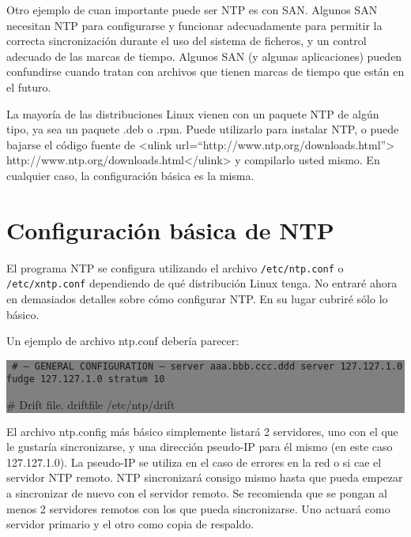 \documentclass[12pt]{article}
\begin{document}
Otro ejemplo de cuan importante puede ser NTP es con SAN. Algunos SAN
necesitan NTP para configurarse y funcionar adecuadamente para permitir
la correcta sincronización durante el uso del sistema de ficheros, y un
control adecuado de las marcas de tiempo. Algunos SAN (y algunas
aplicaciones) pueden confundirse cuando tratan con archivos que tienen marcas
de tiempo que están en el futuro.



La mayoría de las distribuciones Linux vienen con un paquete NTP de
algún tipo, ya sea un paquete .deb o .rpm. Puede utilizarlo para instalar
NTP, o puede bajarse el código fuente de
<ulink url=``http://www.ntp.org/downloads.html''>
http://www.ntp.org/downloads.html</ulink> y compilarlo usted mismo. En
cualquier caso, la configuración básica es la misma.





\section{ Configuración básica de NTP}


El programa NTP se configura utilizando el archivo \texttt{/etc/ntp.conf} o
\texttt{/etc/xntp.conf} dependiendo de qué distribución Linux tenga. No entraré
ahora en demasiados detalles sobre cómo configurar NTP. En su lugar cubriré
sólo lo básico.



Un ejemplo de archivo ntp.conf debería parecer:



\colorbox{grey}{\parbox[t]{0.95\linewidth}{ \vspace*{0.5cm} {\tt
\# --- GENERAL CONFIGURATION ---
server  aaa.bbb.ccc.ddd
server  127.127.1.0
fudge   127.127.1.0 stratum 10

\# Drift file.
driftfile /etc/ntp/drift
 } \vspace*{0.5cm} } } 

	

	El archivo ntp.config más básico simplemente listará 2 servidores, uno
con el que le gustaría sincronizarse, y una dirección pseudo-IP para él 
mismo (en este caso 127.127.1.0). La pseudo-IP se utiliza en el caso de
errores en la red o si cae el servidor NTP remoto. NTP sincronizará
consigo mismo hasta que pueda empezar a sincronizar de nuevo con el 
servidor remoto. Se recomienda que se pongan al menos 2 servidores remotos
con los que pueda sincronizarse. Uno actuará como servidor primario y el 
otro como copia de respaldo.
\end{document}
